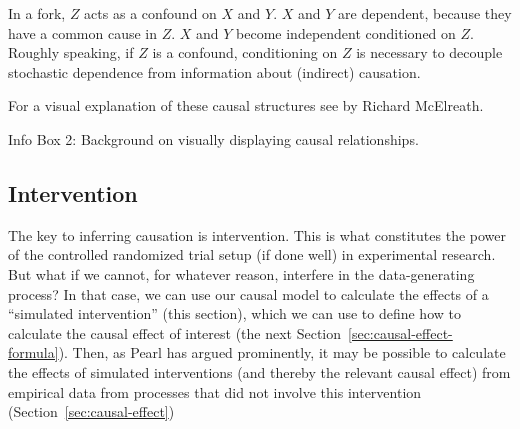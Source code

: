 \documentclass[nobib]{tufte-handout}
\begin{document}
\begin{InfoBox}
{\begin{minipage}{1\textwidth}
    In a fork, $Z$ acts as a confound on $X$ and $Y$.
    $X$ and $Y$ are dependent, because they have a common cause in $Z$.
    $X$ and $Y$ become independent conditioned on $Z$.
    Roughly speaking, if $Z$ is a confound, conditioning on $Z$ is necessary to decouple stochastic dependence from information about (indirect) causation.

    For a visual explanation of these causal structures see  \href{https://youtu.be/mBEA7PKDmiY?si=Ihio7ZXJSuct4J30}{{\color{Red}{this lecture}}} by Richard McElreath.
    \medskip
  \end{minipage}
}
\begin{center}
Info Box 2: Background on visually displaying causal relationships.
\end{center}
\end{InfoBox}



\subsection{Intervention} \label{sec:intervention}

The key to inferring causation is intervention.
This is what constitutes the power of the controlled randomized trial setup (if done well) in experimental research.
But what if we cannot, for whatever reason, interfere in the data-generating process?
In that case, we can use our causal model to calculate the effects of a ``simulated intervention'' (this section), which we can use to define how to calculate the causal effect of interest (the next Section~\ref{sec:causal-effect-formula}).
Then, as Pearl has argued prominently, it may be possible to calculate the effects of simulated interventions (and thereby the relevant causal effect) from empirical data from processes that did not involve this intervention (Section~\ref{sec:causal-effect})



\end{document}
